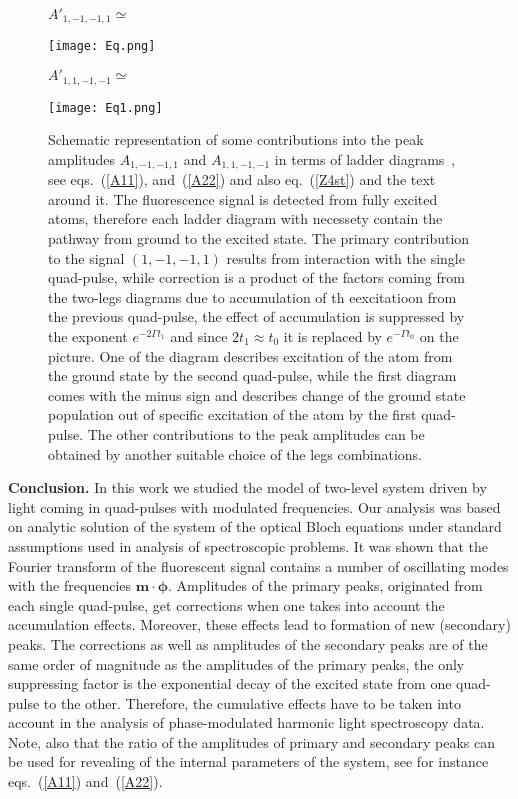 \documentclass[prb,twocolumn,showpacs,epsfig,epsf]{revtex4}
\newcommand{\1}{\mathds{1}}
\begin{document}
\begin{figure}[b]
\parbox[b]{2cm}{\small $A'_{1,-1,-1,1}\simeq$\vspace{17pt}}\texttt{[image: Eq.png]}\\
\parbox[b]{2cm}{\small $A'_{1,1,-1,-1}\simeq$\vspace{17pt}}\texttt{[image: Eq1.png]}
\caption{\small Schematic representation of some contributions into the peak amplitudes $A_{1,-1,-1,1}$ and $A_{1,1,-1,-1}$ in terms of ladder diagrams~\cite{Mbook}, see eqs.~(\ref{A11}), and~(\ref{A22}) and also eq.~(\ref{Z4st}) and the text around it. The fluorescence signal is detected from fully excited atoms, therefore each ladder diagram with necessety contain the pathway from ground to the excited state. The  primary contribution to the signal $(1,-1,-1,1)$ results from interaction with the single quad-pulse, while correction is a product of the factors coming from the two-legs diagrams due to accumulation of th eexcitatioon from the previous quad-pulse, the effect of accumulation is suppressed by the exponent $e^{-2\Gamma t_1}$ and since $2t_1\approx t_0$ it is replaced by $e^{-\Gamma t_0}$ on the picture. One of the diagram describes excitation of the atom from the ground state by the second quad-pulse, while the first diagram comes with the minus sign and describes change of the ground state population out of specific excitation of the atom by the first quad-pulse. The other contributions to the peak amplitudes can be obtained by another suitable choice of the legs combinations.\label{Fig4}}
\end{figure}


{\bf Conclusion.} In this work we studied the model of two-level system driven by light coming in quad-pulses with modulated frequencies. Our analysis was based on analytic solution of the system of the optical Bloch equations under standard assumptions used in analysis of spectroscopic problems. It was shown that the Fourier transform of the fluorescent signal contains a number of oscillating modes with the frequencies ${\boldsymbol m}\cdot {\boldsymbol \phi}$. Amplitudes of the primary peaks, originated from each single quad-pulse, get corrections when one takes into account the accumulation effects. Moreover, these effects lead to formation of new (secondary) peaks. The corrections as well as amplitudes of the secondary peaks are of the same order of magnitude as the amplitudes of the primary peaks, the only suppressing factor is the exponential decay of the excited state from one quad-pulse to the other. Therefore, the cumulative effects have to be taken into account in the analysis of phase-modulated harmonic light spectroscopy data. Note, also that the ratio of the amplitudes of primary and secondary peaks can be used for revealing of the internal parameters of the system, see for instance eqs.~(\ref{A11}) and~(\ref{A22}). 
\end{document}
